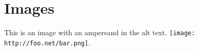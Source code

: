 
\def\mytitle{Link Attributes Test}


\part{Images}
\label{images}

This is an image with an ampersand in the alt text. \texttt{[image: http://foo.net/bar.png]}.




